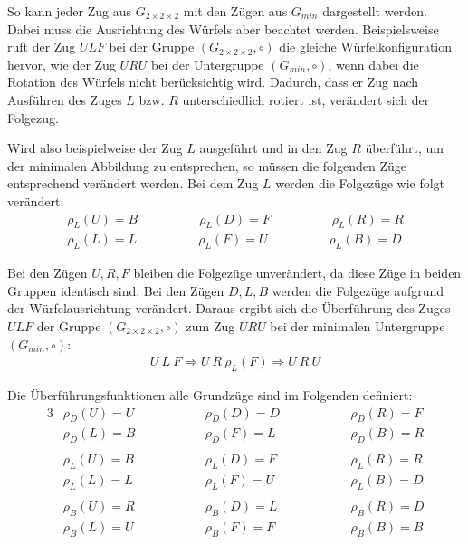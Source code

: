 \documentclass[12pt,a4paper, usenames, dvipsnames]{article}
\theoremstyle{mystyle}
\theoremstyle{definition}
\newcommand{\Gtwo}{\ensuremath{G_{2\times 2\times 2}}}
\begin{document}
So kann jeder Zug aus $\Gtwo$ mit den Zügen aus $G_{min}$ dargestellt werden. Dabei muss die Ausrichtung des Würfels aber beachtet werden. Beispielsweise ruft der Zug $ULF$ bei der Gruppe $(\Gtwo, \circ)$ die gleiche Würfelkonfiguration hervor, wie der Zug $URU$ bei der Untergruppe $(G_{min}, \circ)$, wenn dabei die Rotation des Würfels nicht berücksichtig wird. Dadurch, dass er Zug nach Ausführen des Zuges $L$ bzw. $R$ unterschiedlich rotiert ist, verändert sich der Folgezug.

Wird also beispielweise der Zug $L$ ausgeführt und in den Zug $R$ überführt, um der minimalen Abbildung zu entsprechen, so müssen die folgenden Züge entsprechend verändert werden. Bei dem Zug $L$ werden die Folgezüge wie folgt verändert:
\begin{align*}
\rho_L(U) = B \ \ \ \ \ \ \ \ \ \ \ \ \ \ \ \ \ \ \ \ \ \  \rho_L(D) = F \ \ \ \ \ \ \ \ \ \ \ \ \ \ \ \ \ \ \ \ \ \   \rho_L(R) = R \\
\rho_L(L) = L \ \ \ \ \ \ \ \ \ \ \ \ \ \ \ \ \ \ \ \ \ \  \rho_L(F) = U \ \ \ \ \ \ \ \ \ \ \ \ \ \ \ \ \ \ \ \ \ \  \rho_L(B) = D 
\end{align*}


Bei den Zügen $U, R, F$ bleiben die Folgezüge unverändert, da diese Züge in beiden Gruppen identisch sind. Bei den Zügen $D, L, B$ werden die Folgezüge aufgrund der Würfelausrichtung verändert. Daraus ergibt sich die Überführung des Zuges $ULF$ der Gruppe $(\Gtwo, \circ)$ zum Zug $URU$ bei der minimalen Untergruppe $(G_{min}, \circ)$:
\begin{align*}
U \ L \ F \Rightarrow U \ R \ \rho_L(F) \Rightarrow U \ R \ U
\end{align*}

Die Überführungsfunktionen alle Grundzüge sind im Folgenden definiert:
\begin{alignat*}{3}
 & \rho_D(U) = U \qquad \qquad  && \rho_D(D) = D  \qquad \qquad && \rho_D(R) = F  \\
 & \rho_D(L) = B    && \rho_D(F) = L    && \rho_D(B) =  R \\
\\
 & \rho_L(U) = B  && \rho_L(D) = F  && \rho_L(R) = R \\
 & \rho_L(L) = L  && \rho_L(F) = U  && \rho_L(B) = D  \\
\\
 & \rho_B(U) = R && \rho_B(D) = L   && \rho_B(R) = D \\
 & \rho_B(L) = U  && \rho_B(F) =  F && \rho_B(B) = B  \\
\end{alignat*}
\end{document}
